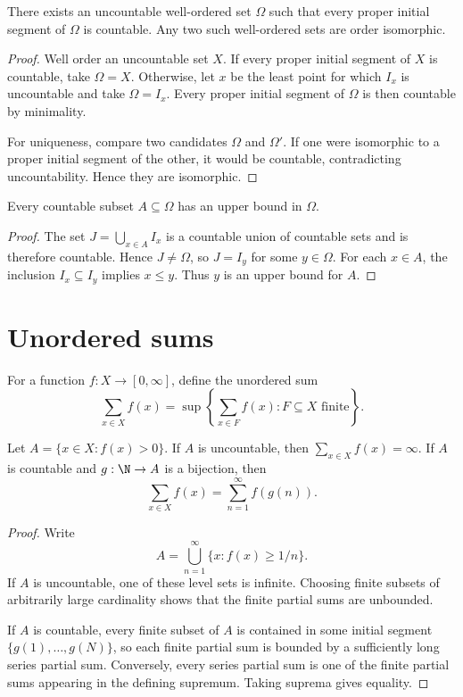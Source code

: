 \begin{thm}
There exists an uncountable well-ordered set $\Omega$ such that every proper initial segment of $\Omega$ is countable. Any two such well-ordered sets are order isomorphic.
\end{thm}

\begin{proof}
Well order an uncountable set $X$. If every proper initial segment of $X$ is countable, take $\Omega=X$. Otherwise, let $x$ be the least point for which $I_x$ is uncountable and take $\Omega=I_x$. Every proper initial segment of $\Omega$ is then countable by minimality.

For uniqueness, compare two candidates $\Omega$ and $\Omega'$. If one were isomorphic to a proper initial segment of the other, it would be countable, contradicting uncountability. Hence they are isomorphic.
\end{proof}

\begin{prop}
Every countable subset $A\subseteq\Omega$ has an upper bound in $\Omega$.
\end{prop}

\begin{proof}
The set $J=\bigcup_{x\in A}I_x$ is a countable union of countable sets and is therefore countable. Hence $J\neq\Omega$, so $J=I_y$ for some $y\in\Omega$. For each $x\in A$, the inclusion $I_x\subseteq I_y$ implies $x\leq y$. Thus $y$ is an upper bound for $A$.
\end{proof}

\section{Unordered sums}

\begin{de}
For a function $f:X\to[0,\infty]$, define the unordered sum
\[
\sum_{x\in X}f(x)
 =\sup\left\{\sum_{x\in F}f(x):F\subseteq X\text{ finite}\right\}.
\]
\end{de}

\begin{prop}
Let $A=\{x\in X:f(x)>0\}$. If $A$ is uncountable, then $\sum_{x\in X}f(x)=\infty$. If $A$ is countable and $g:\N\to A$ is a bijection, then
\[
\sum_{x\in X}f(x)=\sum_{n=1}^{\infty}f(g(n)).
\]
\end{prop}

\begin{proof}
Write
\[
A=\bigcup_{n=1}^{\infty}\{x:f(x)\geq 1/n\}.
\]
If $A$ is uncountable, one of these level sets is infinite. Choosing finite subsets of arbitrarily large cardinality shows that the finite partial sums are unbounded.

If $A$ is countable, every finite subset of $A$ is contained in some initial segment $\{g(1),\dots,g(N)\}$, so each finite partial sum is bounded by a sufficiently long series partial sum. Conversely, every series partial sum is one of the finite partial sums appearing in the defining supremum. Taking suprema gives equality.
\end{proof}
